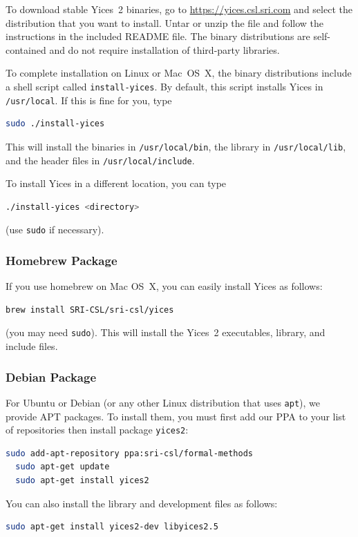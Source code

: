 \documentclass[11pt,twoside,fleqn,openright,titlepage]{cslreport}
\begin{document}
To download stable Yices~2 binaries, go to
\url{https://yices.csl.sri.com} and select the distribution that you
want to install.  Untar or unzip the file and follow the instructions
in the included README file.  The binary distributions are
self-contained and do not require installation of third-party
libraries.

\medskip\noindent
To complete installation on Linux or Mac~OS~X, the binary
distributions include a shell script called \texttt{install-yices}. By
default, this script installs Yices in \texttt{/usr/local}. If
this is fine for you, type
\begin{small}
\begin{lstlisting}[language=sh]
   sudo ./install-yices
\end{lstlisting}
\end{small}
This will install the binaries in \texttt{/usr/local/bin}, the library
in \texttt{/usr/local/lib}, and the header files in
\texttt{/usr/local/include}.

\medskip\noindent
To install Yices in a different location, you can type
\begin{small}
\begin{lstlisting}[language=sh]
   ./install-yices <directory>
\end{lstlisting}
\end{small}
(use \texttt{sudo} if necessary).


\subsubsection{Homebrew Package}

If you use homebrew on Mac OS~X, you can easily install Yices as follows:
\begin{small}
\begin{lstlisting}[language=sh]
   brew install SRI-CSL/sri-csl/yices
\end{lstlisting}
\end{small}
(you may need \texttt{sudo}). This will install the Yices~2
executables, library, and include files.


\subsubsection{Debian Package}

For Ubuntu or Debian (or any other Linux distribution that uses
\texttt{apt}), we provide APT packages. To install them, you must
first add our PPA to your list of repositories then install package
\texttt{yices2}:
\begin{small}
\begin{lstlisting}[language=sh]
  sudo add-apt-repository ppa:sri-csl/formal-methods
  sudo apt-get update
  sudo apt-get install yices2
\end{lstlisting}
\end{small}
You can also install the library and development files as follows:
\begin{small}
\begin{lstlisting}[language=sh]
  sudo apt-get install yices2-dev libyices2.5
\end{lstlisting}
\end{small}
\end{document}
